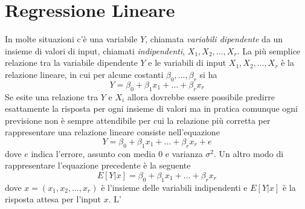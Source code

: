 \chapter{Regressione Lineare}
In molte situazioni c'è una variabile $Y$, chiamata \emph{variabili dipendente} da un insieme di valori di input, chiamati \emph{indipendenti}, $X_1, X_2, \dots, X_r$.\newline
La più semplice relazione tra la variabile dipendente $Y$ e le variabili di input $X_1, X_2, \dots, X_r$ è la relazione lineare, in cui per alcune costanti $\beta_0, \dots, \beta_r$ si ha
\[ Y = \beta_0 + \beta_1x_1 + \dots + \beta_r x_r \]
Se esite una relazione tra $Y$ e $X_i$ allora dovrebbe essere possibile predirre esattamente la risposta per ogni insieme di valori ma in pratica comunque ogni previsione non è sempre
attendibile per cui la relazione più corretta per rappresentare una relazione lineare consiste nell'equazione
\[ Y = \beta_0 + \beta_1x_1 + \dots + \beta_rx_r + e \]
dove $e$ indica l'errore, assunto con media $0$ e varianza $\sigma^2$.\newline
Un altro modo di rappresentare l'equazione precedente è la seguente
\[ E[Y | x] = \beta_0 + \beta_1x_1 + \dots + \beta_rx_r \]
dove $x = (x_1, x_2, \dots, x_r)$ è l'insieme delle variabili indipendenti e $E[Y|x]$ è la risposta attesa per l'input $x$.\newline
L'

